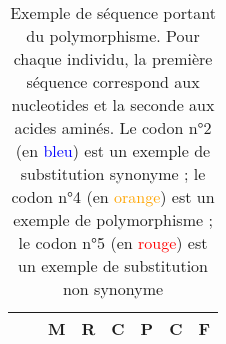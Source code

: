 \documentclass[../main]{subfiles} %
\begin{document}
\begin{table}[]
\begin{tabular}{cccccccc}
                                            &                               & M    & \textbf{R}    & C    & \textbf{P}    & \textbf{C}   & F   \\
        \bottomrule
    \end{tabular}
    \caption{Exemple de séquence portant du polymorphisme. Pour chaque individu, la première séquence correspond aux \glspl{nucleotide} et la seconde aux acides aminés. Le \gls{codon} n°2 (en \textcolor{blue}{bleu}) est un exemple de \gls{substitution} \gls{synonyme} ; le \gls{codon} n°4 (en \textcolor{orange}{orange}) est un exemple de \gls{polymorphisme} ; le \gls{codon} n°5 (en \textcolor{red}{rouge}) est un exemple de \gls{substitution} non \gls{synonyme}
    }
    \label{tab:seqEx}
\end{table}


\end{document}
